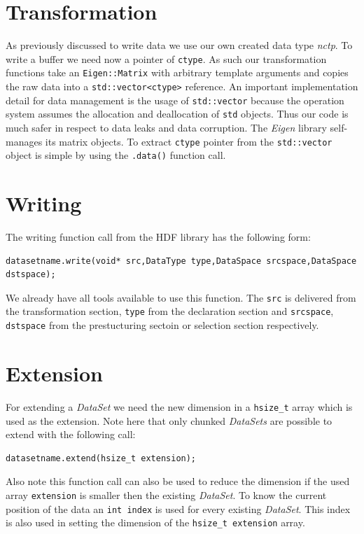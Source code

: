\section{Transformation}
As previously discussed to write data we use our own created data type \textit{nctp}. To write a buffer we need now a pointer of \texttt{ctype}. As such our transformation functions take an \texttt{Eigen::Matrix} with arbitrary template arguments and copies the raw data into a \texttt{std::vector<ctype>} reference. An important implementation detail for data management is the usage of \texttt{std::vector} because the operation system assumes the allocation and deallocation of \texttt{std} objects. Thus our code is much safer in respect to data leaks and data corruption. The \textit{Eigen} library self-manages its matrix objects. To extract \texttt{ctype} pointer from the \texttt{std::vector} object is simple by using the \texttt{.data()} function call.

\section{Writing} 
The writing function call from the HDF library has the following form:
\begin{lstlisting}
datasetname.write(void* src,DataType type,DataSpace srcspace,DataSpace dstspace);
\end{lstlisting}
We already have all tools available to use this function. The \texttt{src} is delivered from the transformation section, \texttt{type} from the declaration section and \texttt{srcspace}, \texttt{dstspace} from the prestucturing sectoin or selection section respectively.

\section{Extension}
For extending a \textit{DataSet} we need the new dimension in a \texttt{hsize\_t} array which is used as the extension. Note here that only chunked \textit{DataSets} are possible to extend with the following call:
\begin{lstlisting}
datasetname.extend(hsize_t extension);
\end{lstlisting}
Also note this function call can also be used to reduce the dimension if the used array \texttt{extension} is smaller then the existing \textit{DataSet}. To know the current position of the data an \texttt{int index} is used for every existing \textit{DataSet}. This index is also used in setting the dimension of the \texttt{hsize\_t extension} array.


